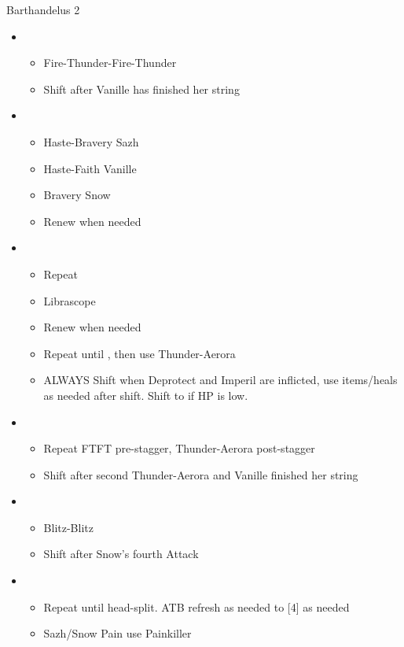 \begin{paracol}{2}
\begin{battle}{Barthandelus 2}
		\begin{itemize}
			\item \fifth
			      \begin{itemize}
				      \item Fire-Thunder-Fire-Thunder
				      \item Shift after Vanille has finished her string
			      \end{itemize}
			\item \first
			      \begin{itemize}
				      \item Haste-Bravery Sazh
				      \item Haste-Faith Vanille
				      \item Bravery Snow
				      \item Renew when needed
			      \end{itemize}
			\item \fifth
			      \begin{itemize}
				      \item Repeat
				      \item Librascope
				      \item Renew when needed
				      \item Repeat until \stagger, then use Thunder-Aerora
				      \item ALWAYS Shift when Deprotect and Imperil are inflicted, use items/heals as needed after shift. Shift to \third if HP is low.
			      \end{itemize}
			\item \second
			      \begin{itemize}
				      \item Repeat FTFT pre-stagger, Thunder-Aerora post-stagger
				      \item Shift after second Thunder-Aerora and Vanille finished her string
			      \end{itemize}
			\item \fourth
			      \begin{itemize}
				      \item Blitz-Blitz
				      \item Shift after Snow's fourth Attack
			      \end{itemize}
			\item \sixth
			      \begin{itemize}
				      \item Repeat until head-split. ATB refresh as needed to [4] as needed
				      \item Sazh/Snow Pain use Painkiller

\end{itemize}
\end{itemize}
\end{battle}
\end{paracol}
